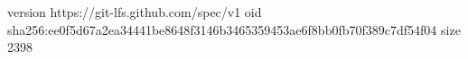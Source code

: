 version https://git-lfs.github.com/spec/v1
oid sha256:ee0f5d67a2ea34441be8648f3146b3465359453ae6f8bb0fb70f389c7df54f04
size 2398
